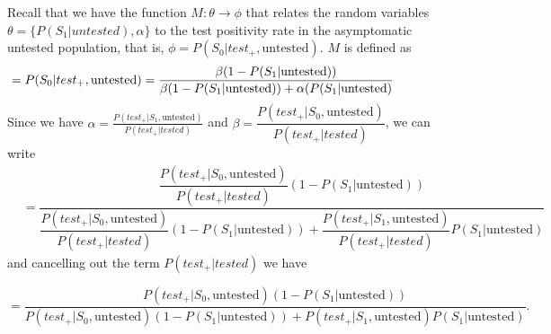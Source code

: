 \documentclass[12pt,twoside]{smiththesis}
\begin{document}
Recall that we have the function \(M: \theta \to \phi\) that relates the random variables \(\theta = \{P(S_1|untested), \alpha\}\) to the test positivity rate in the asymptomatic untested population, that is, \(\phi = P(S_0|test_+, \text{untested})\). \(M\) is defined as
\begin{align*}  &= 
 P(S_0|test_+, \text{untested}) = \dfrac{\beta (1- P(S_1|\text{untested}))}{\beta(1- P(S_1|\text{untested})) + \alpha(P(S_1|\text{untested})} \hspace{ 15 mm }
\end{align*}
\noindent Since we have \(\alpha = \frac{P(test_+|S_1, \text{untested})}{P(test_+|tested)}\) and \(\beta = \dfrac{P(test_+|S_0, \text{untested})}{P(test_+|tested)}\), we can write
\begin{align*}  &= \dfrac{\dfrac{P(test_+|S_0, \text{untested})}{P(test_+|tested)}(1 - P(S_1|\text{untested}))}{\dfrac{P(test_+|S_0, \text{untested})}{P(test_+|tested)}(1-P(S_1|\text{untested})) + \dfrac{P(test_+|S_1, \text{untested})}{P(test_+|tested)} P(S_1|\text{untested})}
\end{align*}
and cancelling out the term \(P(test_+|tested)\) we have

\[ = \dfrac{{P(test_+|S_0, \text{untested})}(1 - P(S_1|\text{untested}))}{P(test_+|S_0, \text{untested})(1-P(S_1|\text{untested})) + P(test_+|S_1, \text{untested}) P(S_1|\text{untested})}.\]
\end{document}
